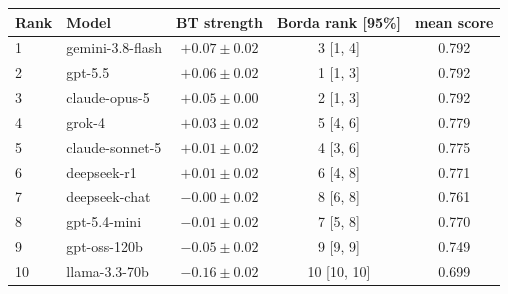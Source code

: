 \begin{tabular}{llccc}
\toprule
Rank & Model & BT strength & Borda rank [95\%] & mean score \\
\midrule
1 & gemini-3.8-flash & $+0.07 \pm 0.02$ & 3 [1, 4] & 0.792 \\
2 & gpt-5.5 & $+0.06 \pm 0.02$ & 1 [1, 3] & 0.792 \\
3 & claude-opus-5 & $+0.05 \pm 0.00$ & 2 [1, 3] & 0.792 \\
4 & grok-4 & $+0.03 \pm 0.02$ & 5 [4, 6] & 0.779 \\
5 & claude-sonnet-5 & $+0.01 \pm 0.02$ & 4 [3, 6] & 0.775 \\
6 & deepseek-r1 & $+0.01 \pm 0.02$ & 6 [4, 8] & 0.771 \\
7 & deepseek-chat & $-0.00 \pm 0.02$ & 8 [6, 8] & 0.761 \\
8 & gpt-5.4-mini & $-0.01 \pm 0.02$ & 7 [5, 8] & 0.770 \\
9 & gpt-oss-120b & $-0.05 \pm 0.02$ & 9 [9, 9] & 0.749 \\
10 & llama-3.3-70b & $-0.16 \pm 0.02$ & 10 [10, 10] & 0.699 \\
\bottomrule
\end{tabular}
